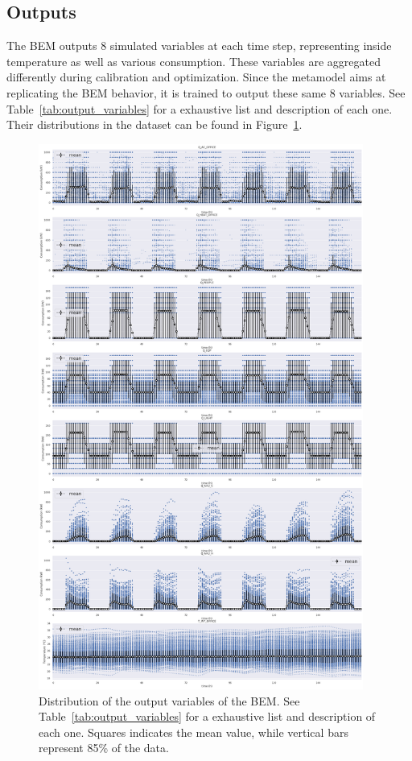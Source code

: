 \documentclass{article}
\begin{document}


\subsection{Outputs}
The BEM outputs 8 simulated variables at each time step, representing inside temperature as well as various consumption. These variables are aggregated differently during calibration and optimization. Since the metamodel aims at replicating the BEM behavior, it is trained to output these same 8 variables. See Table~\ref{tab:output_variables} for a exhaustive list and description of each one. Their distributions in the dataset can be found in Figure~\ref{fig:dataset_output_distribution}.

\begin{figure}
    \centering
    \includegraphics[width=0.95\textwidth]{dataset_distribution_X_168h.png}
    \caption{Distribution of the output variables of the BEM. See Table~\ref{tab:output_variables} for a exhaustive list and description of each one. Squares indicates the mean value, while vertical bars represent 85\% of the data.}
    \label{fig:dataset_output_distribution}
\end{figure}
\end{document}
